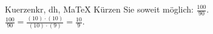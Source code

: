 \begin{MAufgabe}{Kuerzen}{kr, dh, MaTeX}
K\"urzen Sie soweit m\"oglich: $\frac{100}{90}$.\\ 
\ifLsg\MLoesung
\quad $\frac{100}{90}=\frac{(10)\cdot(10)}{(10)\cdot(9)}=\frac{10}{9}$.\else\relax\fi
 \end{MAufgabe}